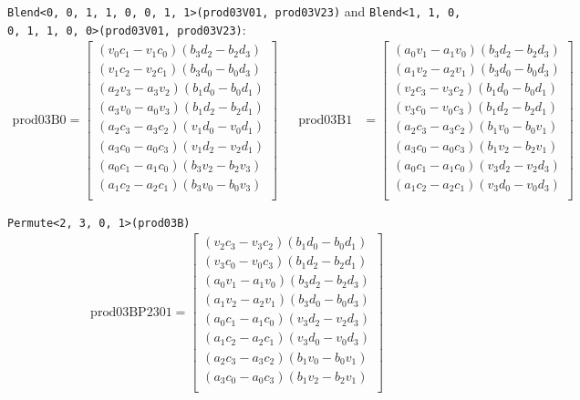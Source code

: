 \documentclass[fontsize = 10pt,DIV = 13]{scrartcl}
\newcommand{\pth}[1]{\left(#1\right)}
\begin{document}
\texttt{Blend<0, 0, 1, 1, 0, 0, 1, 1>(prod03V01, prod03V23)} and \newline
\texttt{Blend<1, 1, 0, 0, 1, 1, 0, 0>(prod03V01, prod03V23)}:
\begin{align*}
\mathrm{prod03B0} 
=
\begin{bmatrix}
\pth{v_0c_1 - v_1c_0}\pth{b_3d_2 - b_2d_3}\\
\pth{v_1c_2 - v_2c_1}\pth{b_3d_0 - b_0d_3}\\
\pth{a_2v_3 - a_3v_2}\pth{b_1d_0 - b_0d_1}\\
\pth{a_3v_0 - a_0v_3}\pth{b_1d_2 - b_2d_1}\\
\pth{a_2c_3 - a_3c_2}\pth{v_1d_0 - v_0d_1}\\
\pth{a_3c_0 - a_0c_3}\pth{v_1d_2 - v_2d_1}\\
\pth{a_0c_1 - a_1c_0}\pth{b_3v_2 - b_2v_3}\\
\pth{a_1c_2 - a_2c_1}\pth{b_3v_0 - b_0v_3}\\
\end{bmatrix}
&&
\mathrm{prod03B1} 
&=
\begin{bmatrix}
\pth{a_0v_1 - a_1v_0}\pth{b_3d_2 - b_2d_3}\\
\pth{a_1v_2 - a_2v_1}\pth{b_3d_0 - b_0d_3}\\
\pth{v_2c_3 - v_3c_2}\pth{b_1d_0 - b_0d_1}\\
\pth{v_3c_0 - v_0c_3}\pth{b_1d_2 - b_2d_1}\\
\pth{a_2c_3 - a_3c_2}\pth{b_1v_0 - b_0v_1}\\
\pth{a_3c_0 - a_0c_3}\pth{b_1v_2 - b_2v_1}\\
\pth{a_0c_1 - a_1c_0}\pth{v_3d_2 - v_2d_3}\\
\pth{a_1c_2 - a_2c_1}\pth{v_3d_0 - v_0d_3}\\
\end{bmatrix}
\end{align*}

\texttt{Permute<2, 3, 0, 1>(prod03B)}
\begin{align*}
\mathrm{prod03BP2301} 
=
\begin{bmatrix}
\pth{v_2c_3 - v_3c_2}\pth{b_1d_0 - b_0d_1}\\
\pth{v_3c_0 - v_0c_3}\pth{b_1d_2 - b_2d_1}\\
\pth{a_0v_1 - a_1v_0}\pth{b_3d_2 - b_2d_3}\\
\pth{a_1v_2 - a_2v_1}\pth{b_3d_0 - b_0d_3}\\
\pth{a_0c_1 - a_1c_0}\pth{v_3d_2 - v_2d_3}\\
\pth{a_1c_2 - a_2c_1}\pth{v_3d_0 - v_0d_3}\\
\pth{a_2c_3 - a_3c_2}\pth{b_1v_0 - b_0v_1}\\
\pth{a_3c_0 - a_0c_3}\pth{b_1v_2 - b_2v_1}\\
\end{bmatrix}
\end{align*}
\end{document}
